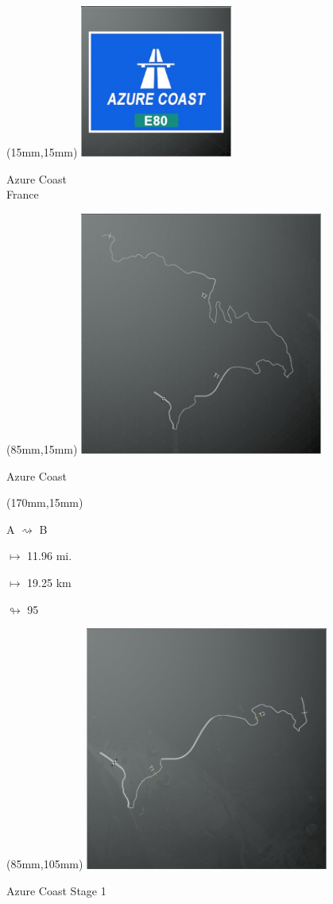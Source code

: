 \begin{textblock*}{60mm}(15mm,15mm)%
\includegraphics[width=50mm]{LG/2015-05-20_00073.png}
\par Azure Coast\\ France
\end{textblock*}
\begin{textblock*}{80mm}(85mm,15mm)%
\includegraphics[width=80mm]{TR/2015-05-20_00002.png}
\centerline{Azure Coast}
\end{textblock*}
\begin{textblock*}{30mm}(170mm,15mm)%
\par A $\rightsquigarrow$ B
\Large
\par$\mapsto$ 11.96 mi.
\par$\mapsto$ 19.25 km
\par$\looparrowright$ 95
\end{textblock*}
\begin{textblock*}{80mm}(85mm,105mm)%
\includegraphics[width=80mm]{TR/2015-05-20_00003.png}
\centerline{Azure Coast Stage 1}
\end{textblock*}
